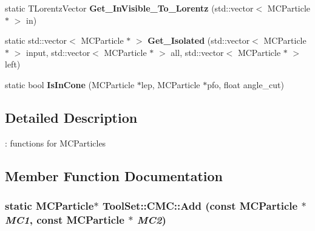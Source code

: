 \begin{DoxyCompactItemize}
\item 
\hypertarget{classToolSet_1_1CMC_ab44cceb872950622551735a97a23bd4d}{
static TLorentzVector {\bfseries Get\_\-InVisible\_\-To\_\-Lorentz} (std::vector$<$ MCParticle $\ast$ $>$ in)}
\label{classToolSet_1_1CMC_ab44cceb872950622551735a97a23bd4d}

\item 
\hypertarget{classToolSet_1_1CMC_af7da55fa17ab746930f3a04eeb3014ef}{
static std::vector$<$ MCParticle $\ast$ $>$ {\bfseries Get\_\-Isolated} (std::vector$<$ MCParticle $\ast$ $>$ input, std::vector$<$ MCParticle $\ast$ $>$ all, std::vector$<$ MCParticle $\ast$ $>$ left)}
\label{classToolSet_1_1CMC_af7da55fa17ab746930f3a04eeb3014ef}

\item 
\hypertarget{classToolSet_1_1CMC_a4594f7a35f5db952f142626100ced91f}{
static bool {\bfseries IsInCone} (MCParticle $\ast$lep, MCParticle $\ast$pfo, float angle\_\-cut)}
\label{classToolSet_1_1CMC_a4594f7a35f5db952f142626100ced91f}

\end{DoxyCompactItemize}


\subsection{Detailed Description}
: functions for MCParticles 

\subsection{Member Function Documentation}
\hypertarget{classToolSet_1_1CMC_ad1b2172aaacc40d4f5971492a5d1a0f5}{
\subsubsection[{Add}]{\setlength{\rightskip}{0pt plus 5cm}static MCParticle$\ast$ ToolSet::CMC::Add (const MCParticle $\ast$ {\em MC1}, \/  const MCParticle $\ast$ {\em MC2})}}
\label{classToolSet_1_1CMC_ad1b2172aaacc40d4f5971492a5d1a0f5}


